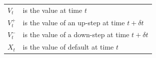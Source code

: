 \documentclass[a4paper,11pt,oneside]{report}
\newcommand{\setlinespacing}[1]
           {\renewcommand{\baselinestretch}{#1}\small\normalsize}
\theoremstyle{plain}
\theoremstyle{definition}
\def\Dt{\ensuremath{\delta t}\xspace}
\begin{document}
\begin{tabular}{ll}
 $V_t$          & is the value at time $t$ \\
 $V^+_t$        & is the value of an up-step at time $t + \Dt$ \\
 $V^-_t$        & is the value of a down-step at time $t + \Dt$ \\
 $X_t$          & is the value of default at time $t$ \\
\end{tabular}



\clearpage
\setlinespacing{1}


\end{document}
